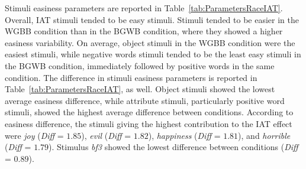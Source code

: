 \documentclass[12pt]{book}
\begin{document}
Stimuli easiness parameters are reported in Table~\ref{tab:ParametersRaceIAT}.
Overall, IAT stimuli tended to be easy stimuli. Stimuli tended to be easier in the WGBB condition than in the BGWB condition, where they showed a higher easiness variability. On average, object stimuli in the WGBB condition were the easiest stimuli, while negative words stimuli tended to be the least easy stimuli in the BGWB condition, immediately followed by positive words in the same condition. 
The difference in stimuli easiness parameters is reported in Table~\ref{tab:ParametersRaceIAT}, as well. Object stimuli showed the lowest average easiness difference, while attribute stimuli, particularly positive word stimuli, showed the highest average difference between conditions. According to easiness difference, the stimuli giving the highest contribution to the IAT effect were \emph{joy} (\emph{Diff} = $1.85$), \emph{evil} (\emph{Diff} = $1.82$), \emph{happiness} (\emph{Diff} = $1.81$), and \emph{horrible} (\emph{Diff} = $1.79$). Stimulus \emph{bf3} showed the lowest difference between conditions (\emph{Diff} = $0.89$). 
%
\end{document}
